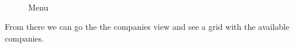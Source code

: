 \begin{figure}[H]
        \myfloatalign
         \quad
         \\
        \caption[Menu]{Menu}
\end{figure}
\newpage

From there we can go the the companies view and see a grid with the available companies.

